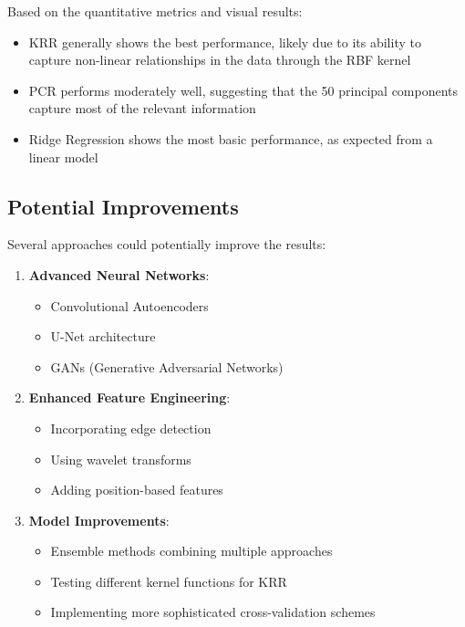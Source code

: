 Based on the quantitative metrics and visual results:
\begin{itemize}
    \item KRR generally shows the best performance, likely due to its ability to capture non-linear relationships in the data through the RBF kernel
    \item PCR performs moderately well, suggesting that the 50 principal components capture most of the relevant information
    \item Ridge Regression shows the most basic performance, as expected from a linear model
\end{itemize}

\subsection{Potential Improvements}
Several approaches could potentially improve the results:

\begin{enumerate}
    \item \textbf{Advanced Neural Networks}:
        \begin{itemize}
            \item Convolutional Autoencoders
            \item U-Net architecture
            \item GANs (Generative Adversarial Networks)
        \end{itemize}
    
    \item \textbf{Enhanced Feature Engineering}:
        \begin{itemize}
            \item Incorporating edge detection
            \item Using wavelet transforms
            \item Adding position-based features
        \end{itemize}
    
    \item \textbf{Model Improvements}:
        \begin{itemize}
            \item Ensemble methods combining multiple approaches
            \item Testing different kernel functions for KRR
            \item Implementing more sophisticated cross-validation schemes
        \end{itemize}
\end{enumerate}